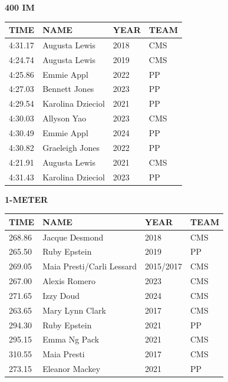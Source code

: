 \begin{table}[H]
\centering
\begin{minipage}[t]{0.6\textwidth}
\centering
\textbf{400 IM}\\[0.1cm]
\begin{tabular}{@{}p{1.8cm}p{2.8cm}p{1.2cm}p{1.4cm}@{}}
\hline
    \textbf{TIME} & \textbf{NAME} & \textbf{YEAR} & \textbf{TEAM} \\
\hline
    4:31.17 & Augusta Lewis & 2018 & CMS \\
    4:24.74 & Augusta Lewis & 2019 & CMS \\
    4:25.86 & Emmie Appl & 2022 & PP \\
    4:27.03 & Bennett Jones & 2023 & PP \\
    4:29.54 & Karolina Dzieciol & 2021 & PP \\
    4:30.03 & Allyson Yao & 2023 & CMS \\
    4:30.49 & Emmie Appl & 2024 & PP \\
    4:30.82 & Graeleigh Jones & 2022 & PP \\
    4:21.91 & Augusta Lewis & 2021 & CMS \\
    4:31.43 & Karolina Dzieciol & 2023 & PP \\
\hline
\end{tabular}
\end{minipage}
\end{table}

\begin{table}[H]
\centering
\begin{minipage}[t]{0.6\textwidth}
\centering
\textbf{1-METER}\\[0.1cm]
\begin{tabular}{@{}p{1.8cm}p{2.8cm}p{1.2cm}p{1.4cm}@{}}
\hline
    \textbf{TIME} & \textbf{NAME} & \textbf{YEAR} & \textbf{TEAM} \\
\hline
    268.86 & Jacque Desmond & 2018 & CMS \\
    265.50 & Ruby Epstein & 2019 & PP \\
    269.05 & Maia Presti/Carli Lessard & 2015/2017 & CMS \\
    267.00 & Alexis Romero & 2023 & CMS \\
    271.65 & Izzy Doud & 2024 & CMS \\
    263.65 & Mary Lynn Clark & 2017 & CMS \\
    294.30 & Ruby Epstein & 2021 & PP \\
    295.15 & Emma Ng Pack & 2021 & CMS \\
    310.55 & Maia Presti & 2017 & CMS \\
    273.15 & Eleanor Mackey & 2021 & PP \\
\hline
\end{tabular}
\end{minipage}
\end{table}


